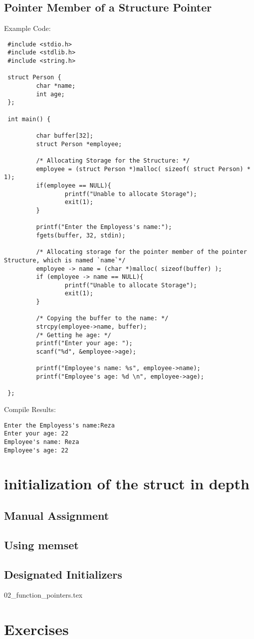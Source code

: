\subsection{Pointer Member of a Structure Pointer}
Example Code:
\begin{lstlisting} 
 #include <stdio.h>
 #include <stdlib.h>
 #include <string.h>

 struct Person {
         char *name;
         int age;
 };

 int main() {

         char buffer[32];
         struct Person *employee;

         /* Allocating Storage for the Structure: */
         employee = (struct Person *)malloc( sizeof( struct Person) * 1);
         if(employee == NULL){
                 printf("Unable to allocate Storage");
                 exit(1);
         }

         printf("Enter the Employess's name:");
         fgets(buffer, 32, stdin);

         /* Allocating storage for the pointer member of the pointer Structure, which is named `name`*/
         employee -> name = (char *)malloc( sizeof(buffer) );
         if (employee -> name == NULL){
                 printf("Unable to allocate Storage");
                 exit(1);
         }

         /* Copying the buffer to the name: */
         strcpy(employee->name, buffer);
         /* Getting he age: */
         printf("Enter your age: ");
         scanf("%d", &employee->age);

         printf("Employee's name: %s", employee->name);
         printf("Employee's age: %d \n", employee->age);

 };
\end{lstlisting}

Compile Results:
\begin{lstlisting} 
Enter the Employess's name:Reza
Enter your age: 22
Employee's name: Reza
Employee's age: 22
\end{lstlisting}

\section{initialization of the struct in depth}
\subsection{Manual Assignment}
\subsection{Using memset}
\subsection{Designated Initializers}

{02_function_pointers.tex}

\section{Exercises}
